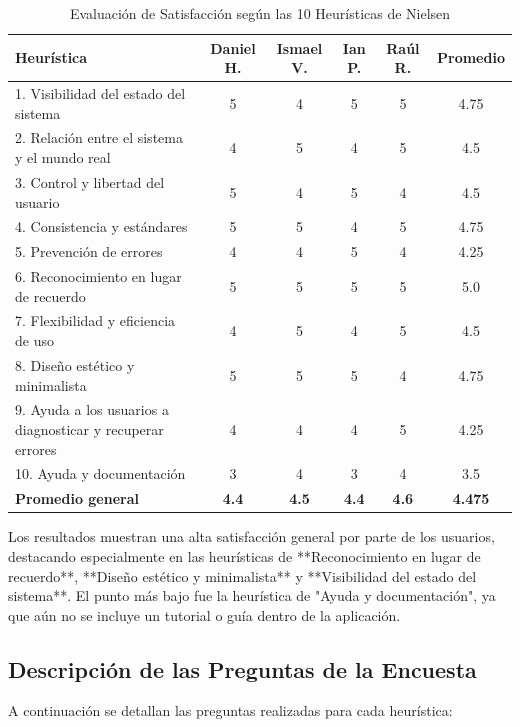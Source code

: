 \documentclass[12pt,a4paper]{article}
\begin{document}
\begin{table}[H]
\centering
\caption{Evaluación de Satisfacción según las 10 Heurísticas de Nielsen}
\label{tab:heuristicas}
\begin{tabular}{|l|c|c|c|c|c|}
\hline
\textbf{Heurística} & \textbf{Daniel H.} & \textbf{Ismael V.} & \textbf{Ian P.} & \textbf{Raúl R.} & \textbf{Promedio} \\
\hline
1. Visibilidad del estado del sistema & 5 & 4 & 5 & 5 & 4.75 \\
2. Relación entre el sistema y el mundo real & 4 & 5 & 4 & 5 & 4.5 \\
3. Control y libertad del usuario & 5 & 4 & 5 & 4 & 4.5 \\
4. Consistencia y estándares & 5 & 5 & 4 & 5 & 4.75 \\
5. Prevención de errores & 4 & 4 & 5 & 4 & 4.25 \\
6. Reconocimiento en lugar de recuerdo & 5 & 5 & 5 & 5 & 5.0 \\
7. Flexibilidad y eficiencia de uso & 4 & 5 & 4 & 5 & 4.5 \\
8. Diseño estético y minimalista & 5 & 5 & 5 & 4 & 4.75 \\
9. Ayuda a los usuarios a diagnosticar y recuperar errores & 4 & 4 & 4 & 5 & 4.25 \\
10. Ayuda y documentación & 3 & 4 & 3 & 4 & 3.5 \\
\hline
\textbf{Promedio general} & \textbf{4.4} & \textbf{4.5} & \textbf{4.4} & \textbf{4.6} & \textbf{4.475} \\
\hline
\end{tabular}
\end{table}

Los resultados muestran una alta satisfacción general por parte de los usuarios, destacando especialmente en las heurísticas de **Reconocimiento en lugar de recuerdo**, **Diseño estético y minimalista** y **Visibilidad del estado del sistema**. El punto más bajo fue la heurística de "Ayuda y documentación", ya que aún no se incluye un tutorial o guía dentro de la aplicación.

\subsection{Descripción de las Preguntas de la Encuesta}

A continuación se detallan las preguntas realizadas para cada heurística:
\end{document}
